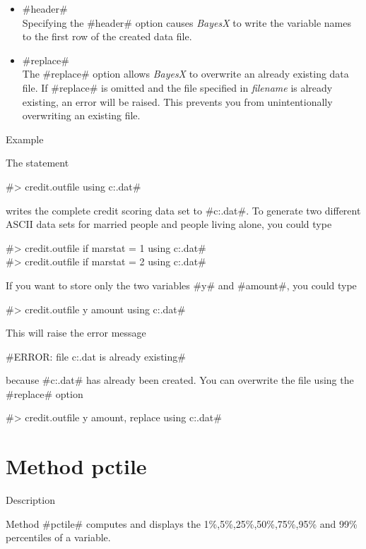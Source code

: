

\begin{itemize}
\item #header# \\
Specifying the #header# option causes {\em BayesX} to write the
variable names to the first row of the created data file.
\item #replace# \\
The #replace# option allows {\em BayesX} to overwrite an already
existing data file. If #replace# is omitted and the file specified
in {\em filename} is already existing, an error will be raised.
This prevents you from unintentionally overwriting an existing
file.
\end{itemize}


\begin{stanza}{Example}

The statement

#> credit.outfile using c:\data\cr.dat#

writes the complete credit scoring data set to
#c:\data\cr.dat#. To generate two different
ASCII
data sets for married people and people living alone, you could type

#> credit.outfile if marstat = 1 using c:\data\crmarried.dat# \\
#> credit.outfile if marstat = 2 using c:\data\cralone.dat#

If you want to store only the two variables #y# and #amount#, you
could type

#> credit.outfile y amount using c:\data\cr.dat#

This will raise the error message

#ERROR: file c:\data\cr.dat is already existing#

because #c:\data\cr.dat# has already been created. You can
overwrite the file using the #replace# option

#> credit.outfile y amount, replace using c:\data\cr.dat#
\end{stanza}



\clearpage



\section{Method pctile}
\label{pcitle} 

\begin{stanza}{Description}

Method #pctile# computes and displays the
1\%,5\%,25\%,50\%,75\%,95\% and 99\%  percentiles of a variable.
\end{stanza}

